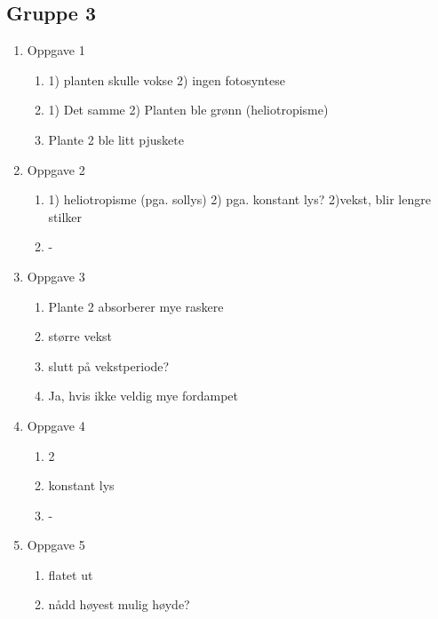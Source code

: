  
 


\subsection{Gruppe 3}
\begin{enumerate}
	\item Oppgave 1
	\begin{enumerate}
		\item 1) planten skulle vokse 2) ingen fotosyntese
		\item 1) Det samme 2) Planten ble grønn (heliotropisme) 
		\item Plante 2 ble litt pjuskete
	\end{enumerate}

	\item Oppgave 2
	\begin{enumerate}
		\item 1) heliotropisme (pga. sollys) 2) pga. konstant lys? 2)vekst, blir lengre stilker
		\item - 
	\end{enumerate}	

	\item Oppgave 3
	\begin{enumerate}
		\item Plante 2 absorberer mye raskere
		\item større vekst
		\item slutt på vekstperiode?
		\item Ja, hvis ikke veldig mye fordampet
	\end{enumerate}

	\item Oppgave 4
	\begin{enumerate}
		\item 2
		\item konstant lys
		\item -
	\end{enumerate}

	\item Oppgave 5
	\begin{enumerate}
		\item flatet ut
		\item nådd høyest mulig høyde?
	\end{enumerate}
\end{enumerate}
